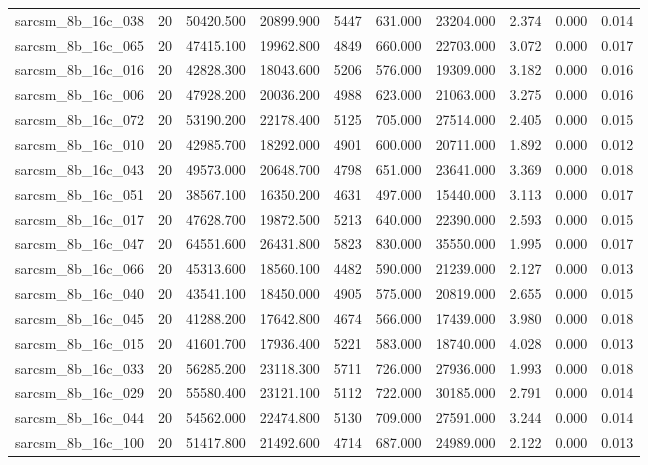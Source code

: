\begin{tabular}{lrrrrrrrrr}
sarcsm\_8b\_16c\_038 & 20 & 50420.500 & 20899.900 & 5447 & 631.000 & 23204.000 & 2.374 & 0.000 & 0.014 \\
sarcsm\_8b\_16c\_065 & 20 & 47415.100 & 19962.800 & 4849 & 660.000 & 22703.000 & 3.072 & 0.000 & 0.017 \\
sarcsm\_8b\_16c\_016 & 20 & 42828.300 & 18043.600 & 5206 & 576.000 & 19309.000 & 3.182 & 0.000 & 0.016 \\
sarcsm\_8b\_16c\_006 & 20 & 47928.200 & 20036.200 & 4988 & 623.000 & 21063.000 & 3.275 & 0.000 & 0.016 \\
sarcsm\_8b\_16c\_072 & 20 & 53190.200 & 22178.400 & 5125 & 705.000 & 27514.000 & 2.405 & 0.000 & 0.015 \\
sarcsm\_8b\_16c\_010 & 20 & 42985.700 & 18292.000 & 4901 & 600.000 & 20711.000 & 1.892 & 0.000 & 0.012 \\
sarcsm\_8b\_16c\_043 & 20 & 49573.000 & 20648.700 & 4798 & 651.000 & 23641.000 & 3.369 & 0.000 & 0.018 \\
sarcsm\_8b\_16c\_051 & 20 & 38567.100 & 16350.200 & 4631 & 497.000 & 15440.000 & 3.113 & 0.000 & 0.017 \\
sarcsm\_8b\_16c\_017 & 20 & 47628.700 & 19872.500 & 5213 & 640.000 & 22390.000 & 2.593 & 0.000 & 0.015 \\
sarcsm\_8b\_16c\_047 & 20 & 64551.600 & 26431.800 & 5823 & 830.000 & 35550.000 & 1.995 & 0.000 & 0.017 \\
sarcsm\_8b\_16c\_066 & 20 & 45313.600 & 18560.100 & 4482 & 590.000 & 21239.000 & 2.127 & 0.000 & 0.013 \\
sarcsm\_8b\_16c\_040 & 20 & 43541.100 & 18450.000 & 4905 & 575.000 & 20819.000 & 2.655 & 0.000 & 0.015 \\
sarcsm\_8b\_16c\_045 & 20 & 41288.200 & 17642.800 & 4674 & 566.000 & 17439.000 & 3.980 & 0.000 & 0.018 \\
sarcsm\_8b\_16c\_015 & 20 & 41601.700 & 17936.400 & 5221 & 583.000 & 18740.000 & 4.028 & 0.000 & 0.013 \\
sarcsm\_8b\_16c\_033 & 20 & 56285.200 & 23118.300 & 5711 & 726.000 & 27936.000 & 1.993 & 0.000 & 0.018 \\
sarcsm\_8b\_16c\_029 & 20 & 55580.400 & 23121.100 & 5112 & 722.000 & 30185.000 & 2.791 & 0.000 & 0.014 \\
sarcsm\_8b\_16c\_044 & 20 & 54562.000 & 22474.800 & 5130 & 709.000 & 27591.000 & 3.244 & 0.000 & 0.014 \\
sarcsm\_8b\_16c\_100 & 20 & 51417.800 & 21492.600 & 4714 & 687.000 & 24989.000 & 2.122 & 0.000 & 0.013 \\

\end{tabular}

